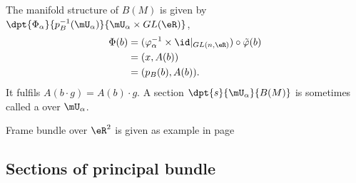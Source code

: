 		The manifold structure of $B(M)$ is given by $\dpt{\Phi_{\alpha}}{p_B^{-1}(\mU_{\alpha})}{\mU_{\alpha}\times GL(\eR)}$,
		\begin{equation}
		\begin{split}
		\Phi(b)&=(\varphi_{\alpha}^{-1}\times \id|_{GL(n,\eR)})\circ\tilde{\varphi}(b)\\
						 &=(x,A(b))\\
						 &=(p_B(b),A(b)).
						 \end{split}
						 \end{equation}
						 It fulfils $A(b\cdot g)=A(b)\cdot g$. A section $\dpt{s}{\mU_{\alpha}}{B(M)}$ is sometimes called a  over $\mU_{\alpha}$.

						 Frame bundle over $\eR^2$ is given as example in page \pageref{Pg_exempleRdeux}

												 \subsection{Sections of principal bundle}

